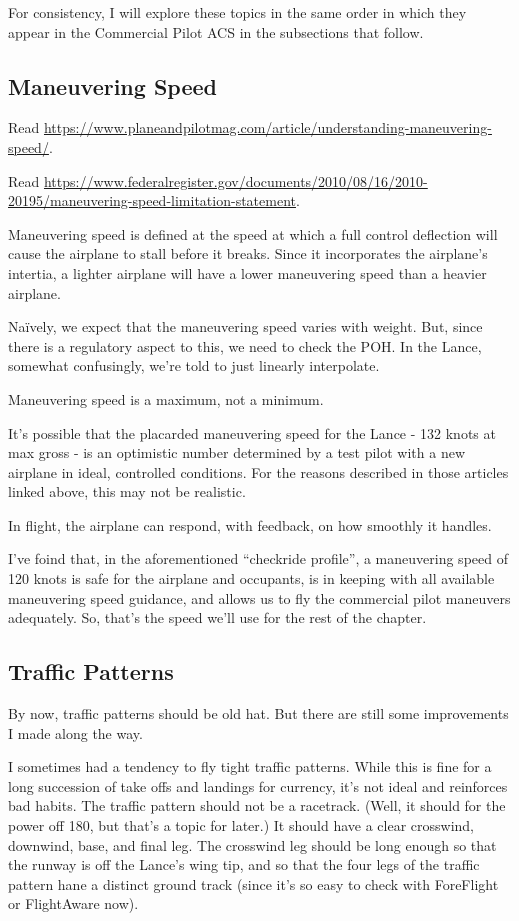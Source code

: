 For consistency, I will explore these topics in the same order in which they appear in the Commercial Pilot ACS in the subsections that follow.

\subsection{Maneuvering Speed}

Read \url{https://www.planeandpilotmag.com/article/understanding-maneuvering-speed/}.

Read \url{https://www.federalregister.gov/documents/2010/08/16/2010-20195/maneuvering-speed-limitation-statement}.

Maneuvering speed is defined at the speed at which a full control deflection will cause the airplane to stall before it breaks. Since it incorporates the airplane's intertia, a lighter airplane will have a lower maneuvering speed than a heavier airplane.

Na\"ively, we expect that the maneuvering speed varies with weight. But, since there is a regulatory aspect to this, we need to check the POH. In the Lance, somewhat confusingly, we're told to just linearly interpolate.

Maneuvering speed is a maximum, not a minimum.

It's possible that the placarded maneuvering speed for the Lance - 132 knots at max gross - is an optimistic number determined by a test pilot with a new airplane in ideal, controlled conditions. For the reasons described in those articles linked above, this may not be realistic.

In flight, the airplane can respond, with feedback, on how smoothly it handles.

I've foind that, in the aforementioned ``checkride profile'', a maneuvering speed of 120 knots is safe for the airplane and occupants, is in keeping with all available maneuvering speed guidance, and allows us to fly the commercial pilot maneuvers adequately. So, that's the speed we'll use for the rest of the chapter.

\subsection{Traffic Patterns}

By now, traffic patterns should be old hat. But there are still some improvements I made along the way.

I sometimes had a tendency to fly tight traffic patterns. While this is fine for a long succession of take offs and landings for currency, it's not ideal and reinforces bad habits. The traffic pattern should not be a racetrack. (Well, it should for the power off 180, but that's a topic for later.) It should have a clear crosswind, downwind, base, and final leg. The crosswind leg should be long enough so that the runway is off the Lance's wing tip, and so that the four legs of the traffic pattern hane a distinct ground track (since it's so easy to check with ForeFlight or FlightAware now).

